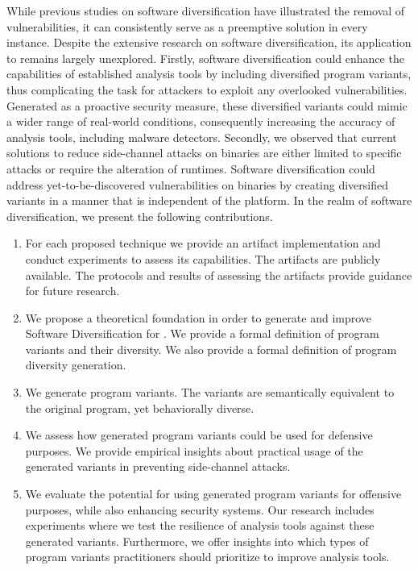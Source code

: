 While previous studies on software diversification have illustrated the removal of vulnerabilities, it can consistently serve as a preemptive solution in every instance. 
Despite the extensive research on software diversification, its application to \Wasm remains largely unexplored. 
Firstly, software diversification could enhance the capabilities of established \Wasm analysis tools by including diversified program variants, thus complicating the task for attackers to exploit any overlooked vulnerabilities. 
Generated as a proactive security measure, these diversified variants could mimic a wider range of real-world conditions, consequently increasing the accuracy of \Wasm analysis tools, including \Wasm malware detectors. 
Secondly, we observed that current solutions to reduce side-channel attacks on \Wasm binaries are either limited to specific attacks or require the alteration of runtimes. 
Software diversification could address yet-to-be-discovered vulnerabilities on \Wasm binaries by creating diversified variants in a manner that is independent of the platform. 
In the realm of software diversification, we present the following contributions.


\begin{enumerate}[label=\textbf{C\arabic*}, ref=C\arabic*]
	\item \label{methodcontrib}  For each proposed technique we provide an artifact implementation and conduct experiments to assess its capabilities. The artifacts are publicly available. The protocols and results of assessing the artifacts provide guidance for future research.
	
	\item \label{therycontrib}  We propose a theoretical foundation in order to generate and improve Software Diversification for \Wasm. We provide a formal definition of \Wasm program variants and their diversity. We also provide a formal definition of \Wasm program diversity generation.
	
	\item \label{generationcontrib}  We generate \Wasm program variants. The variants are semantically equivalent to the original program, yet behaviorally diverse.
	
	\item \label{defensivecontrib}  We assess how generated \Wasm program variants could be used for defensive purposes. We provide empirical insights about practical usage of the generated variants in preventing side-channel attacks.
	
	\item \label{ofensivecontrib}  
	We evaluate the potential for using generated \Wasm program variants for offensive purposes, while also enhancing security systems. 
	Our research includes experiments where we test the resilience of \Wasm analysis tools against these generated variants. 
	Furthermore, we offer insights into which types of program variants practitioners should prioritize to improve \Wasm analysis tools.

	
\end{enumerate}

